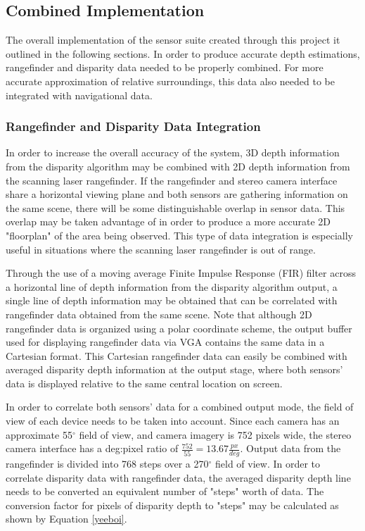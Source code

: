 \subsection{Combined Implementation}
The overall implementation of the sensor suite created through this project it outlined in the following sections. In order to produce accurate depth estimations, rangefinder and disparity data needed to be properly combined. For more accurate approximation of relative surroundings, this data also needed to be integrated with navigational data. 
\subsubsection{Rangefinder and Disparity Data Integration}
In order to increase the overall accuracy of the system, 3D depth information from the disparity algorithm may be combined with 2D depth information from the scanning laser rangefinder. If the rangefinder and stereo camera interface share a horizontal viewing plane and both sensors are gathering information on the same scene, there will be some distinguishable overlap in sensor data. This overlap may be taken advantage of in order to produce a more accurate 2D "floorplan" of the area being observed. This type of data integration is especially useful in situations where the scanning laser rangefinder is out of range.
\par
Through the use of a moving average Finite Impulse Response (FIR) filter across a horizontal line of depth information from the disparity algorithm output, a single line of depth information may be obtained that can be correlated with rangefinder data obtained from the same scene. Note that although 2D rangefinder data is organized using a polar coordinate scheme, the output buffer used for displaying rangefinder data via VGA contains the same data in a Cartesian format. This Cartesian rangefinder data can easily be combined with averaged disparity depth information at the output stage, where both sensors' data is displayed relative to the same central location on screen. 
\par
In order to correlate both sensors' data for a combined output mode, the field of view of each device needs to be taken into account. Since each camera has an approximate 55$^\circ$ field of view, and camera imagery is 752 pixels wide, the stereo camera interface has a deg:pixel ratio of $\frac{752}{55}=13.67\frac{px}{deg}$. Output data from the rangefinder is divided into 768 steps over a 270$^\circ$ field of view. In order to correlate disparity data with rangefinder data, the averaged disparity depth line needs to be converted an equivalent number of "steps" worth of data. The conversion factor for pixels of disparity depth to "steps" may be calculated as shown by Equation \ref{yeeboi}.
